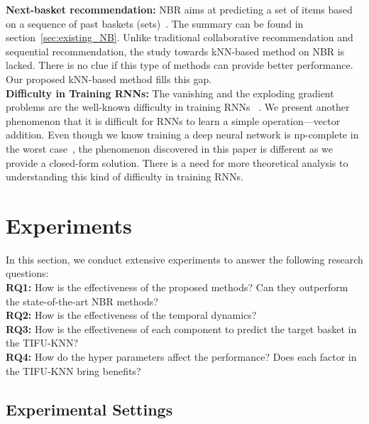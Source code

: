 \documentclass[sigconf]{acmart}
\begin{document}
\textbf{Next-basket recommendation:} NBR aims at predicting a set of items based on a sequence of past baskets (sets)~\cite{rendle2010factorizing}\cite{wang2015learning}\cite{yu2016dynamic}\cite{ying2018sequential}\cite{bai2018attribute}\cite{hu2019sets2sets}. The summary can be found in section~\ref{sec:existing_NB}. Unlike traditional collaborative recommendation and sequential recommendation, the study towards kNN-based method on NBR is lacked. There is no clue if this type of methods can provide better performance. Our proposed  kNN-based method fills this gap.
\\
\textbf{Difficulty in  Training RNNs:}
The vanishing and the exploding gradient problems are the well-known difficulty in training RNNs ~\cite{pascanu2013difficulty}. We present another phenomenon that it is difficult  for RNNs to learn a simple operation---vector addition. Even though we know training a deep neural network is  np-complete in the worst case~\cite{blum1989training}, the  phenomenon discovered  in this paper is different as we provide a  closed-form solution. There is a need for more  theoretical  analysis to  understanding this kind of  difficulty in training RNNs. 

\section{Experiments}
\label{sec:experiment}


In this section, we conduct extensive experiments to answer the following research questions: 
\\
\textbf{RQ1:} How is the effectiveness of the proposed methods? Can they   outperform the  state-of-the-art NBR  methods? 
\\
\textbf{RQ2:} How is the effectiveness of the temporal dynamics?
\\
\textbf{RQ3:} How is the effectiveness of each component to predict the target basket in the TIFU-KNN?
\\
\textbf{RQ4:} How do the hyper parameters affect the performance?  Does each factor in the TIFU-KNN bring benefits?




\subsection{Experimental Settings}
\end{document}
